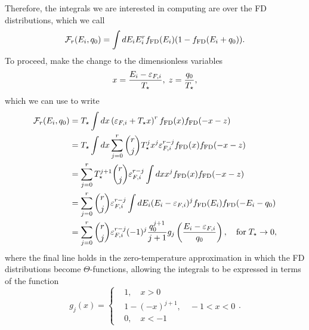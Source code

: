 Therefore, the integrals we are interested in computing are over the FD distributions, which we call
\begin{equation}
    \mathcal{F}_r(E_i, q_0) = \int dE_i E_i^r f_{\rm FD}(E_i)(1 - f_{\rm FD}(E_i + q_0)).
\end{equation}
To proceed, make the change to the dimensionless variables
\begin{equation}
    x = \frac{E_i - \varepsilon_{F,i}}{T_\star}, \; z = \frac{q_0}{T_\star},
\end{equation}
which we can use to write
\begin{align}
       \mathcal{F}_r(E_i, q_0) & = T_\star\int dx \left( \varepsilon_{F,i} + T_\star x\right)^r f_{\rm FD}(x)f_{\rm FD}(-x-z)\\
       & = T_\star\int dx \sum_{j = 0}^r \binom{r}{j} T_\star^j x^j \varepsilon_{F,i}^{r-j}f_{\rm FD}(x)f_{\rm FD}(-x-z)\\
       & = \sum_{j = 0}^r T_\star^{j+1} \binom{r}{j}\varepsilon_{F,i}^{r-j}\int dx x^jf_{\rm FD}(x)f_{\rm FD}(-x-z)\\
       & =  \sum_{j = 0}^r \binom{r}{j} \varepsilon_{F,i}^{r-j} \int dE_i (E_i - \varepsilon_{F,i})^j f_{\rm FD}(E_i)f_{\rm FD}(-E_i - q_0)\\ 
       & = \sum_{j = 0}^r \binom{r}{j} \varepsilon_{F,i}^{r-j} (-1)^{j} \frac{q_0^{j+1}}{j+1}g_j\left( \frac{E_i - \varepsilon_{F,i}}{q_0} \right),\quad\mathrm{for}\; T_\star\rightarrow 0,
\end{align}
where the final line holds in the zero-temperature approximation in which the FD distributions become $\Theta$-functions, allowing the integrals to be expressed in terms of the function 
\begin{equation}
    g_j(x) = \begin{cases}
        & 1, \quad x >0\\
        & 1-(-x)^{j+1},\quad -1<x <0\\
        & 0,\quad x<-1
    \end{cases}.
\end{equation}

